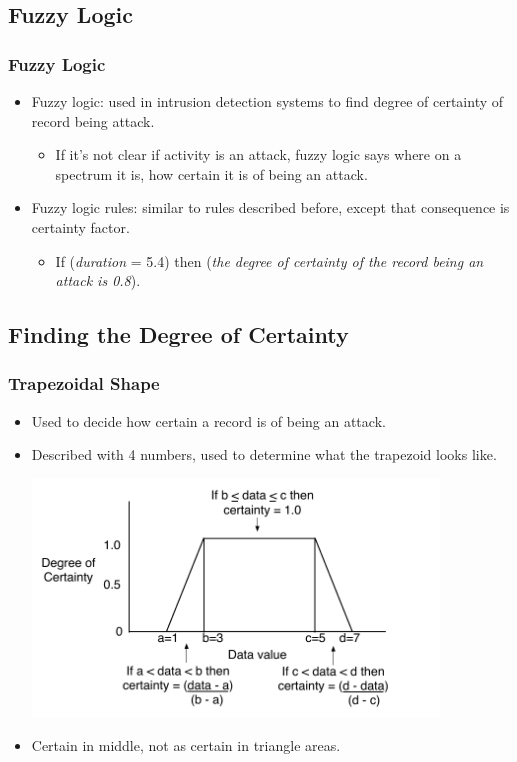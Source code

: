 \documentclass{beamer}
\newcommand{\linespace}{\vskip 0.25cm}
\begin{document}
\subsection{Fuzzy Logic}
\begin{frame}
	\frametitle{Fuzzy Logic}
	\begin{itemize}
		\item Fuzzy logic: used in intrusion detection systems to find degree of certainty of record being attack.
			\begin{itemize}
				\item If it's not clear if activity is an attack, fuzzy logic says where on a spectrum it is, how certain it is of being an attack.
			\end{itemize}
		\linespace
		\linespace
		\linespace
		\item Fuzzy logic rules: similar to rules described before, except that
consequence is certainty factor. 
		\begin{itemize}
			\item If (\emph{duration} = 5.4) then (\emph{the degree of certainty of the record being an attack is 0.8}).
		\end{itemize}
	\end{itemize}
\end{frame}

\subsection{Finding the Degree of Certainty}
\begin{frame}
  \frametitle{Trapezoidal Shape}
	\begin{itemize}
		\item Used to decide how certain a record is of being an attack.
		\item Described with 4 numbers, used to determine what the trapezoid looks like.
		\begin{center}
		  \includegraphics[width=0.85\textwidth]{../trapFigTemplate.pdf}		
		\end{center}
		\item Certain in middle, not as certain in triangle areas.
	\end{itemize}
\end{frame}
\end{document}
